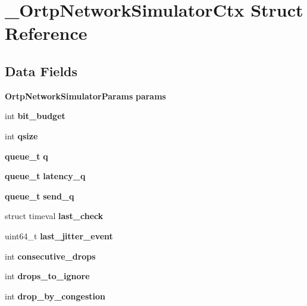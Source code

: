 \section{\+\_\+\+Ortp\+Network\+Simulator\+Ctx Struct Reference}
\label{struct__OrtpNetworkSimulatorCtx}
\subsection*{Data Fields}
\begin{DoxyCompactItemize}
\item 
\mbox{\label{struct__OrtpNetworkSimulatorCtx_a781f64cd686fc7b8592908139226bc70}} 
\textbf{ Ortp\+Network\+Simulator\+Params} {\bfseries params}
\item 
\mbox{\label{struct__OrtpNetworkSimulatorCtx_a20f9e788046c28025aa17ccb33ef1965}} 
int {\bfseries bit\+\_\+budget}
\item 
\mbox{\label{struct__OrtpNetworkSimulatorCtx_a3b80f61d77d3e0fdfc73b15407d625fb}} 
int {\bfseries qsize}
\item 
\mbox{\label{struct__OrtpNetworkSimulatorCtx_abbe70b7885dc2712d8aace28a6bd9468}} 
\textbf{ queue\+\_\+t} {\bfseries q}
\item 
\mbox{\label{struct__OrtpNetworkSimulatorCtx_a2676101172eeb42ce9d8d9e2e2a6028b}} 
\textbf{ queue\+\_\+t} {\bfseries latency\+\_\+q}
\item 
\mbox{\label{struct__OrtpNetworkSimulatorCtx_a9240fac7e9ac3115c6d1500e8180d700}} 
\textbf{ queue\+\_\+t} {\bfseries send\+\_\+q}
\item 
\mbox{\label{struct__OrtpNetworkSimulatorCtx_a81a9c53e3c179f6ec127f923e8965ec8}} 
struct timeval {\bfseries last\+\_\+check}
\item 
\mbox{\label{struct__OrtpNetworkSimulatorCtx_aa43a156d450224029b32487bf2311a3f}} 
uint64\+\_\+t {\bfseries last\+\_\+jitter\+\_\+event}
\item 
\mbox{\label{struct__OrtpNetworkSimulatorCtx_a4d0767e43154c10450d75058b66543a1}} 
int {\bfseries consecutive\+\_\+drops}
\item 
\mbox{\label{struct__OrtpNetworkSimulatorCtx_abcb409b7acb71b5ac10ae48888bdf675}} 
int {\bfseries drops\+\_\+to\+\_\+ignore}
\item 
\mbox{\label{struct__OrtpNetworkSimulatorCtx_ac34086e84e517fffaaa4e88b4c312c13}} 
int {\bfseries drop\+\_\+by\+\_\+congestion}
\item 
\mbox{\label{struct__OrtpNetworkSimulatorCtx_a515b5fc7e6b74c67cc234a3e14b3a633}} 

\end{DoxyCompactItemize}

